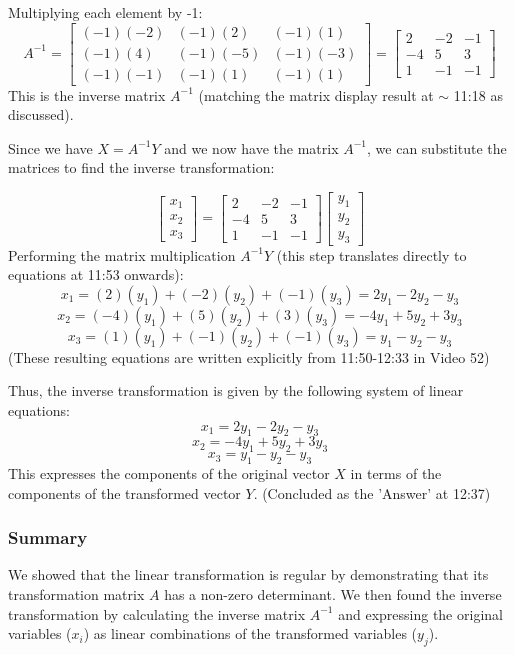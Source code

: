 \documentclass{article}
\begin{document}
    Multiplying each element by -1:
    \[ A^{-1} = \begin{bmatrix} (-1)(-2) & (-1)(2) & (-1)(1) \\ (-1)(4) & (-1)(-5) & (-1)(-3) \\ (-1)(-1) & (-1)(1) & (-1)(1) \end{bmatrix} = \begin{bmatrix} 2 & -2 & -1 \\ -4 & 5 & 3 \\ 1 & -1 & -1 \end{bmatrix} \]
    This is the inverse matrix $A^{-1}$ (matching the matrix display result at $\sim$ 11:18 as discussed).

Since we have $X = A^{-1} Y$ and we now have the matrix $A^{-1}$, we can substitute the matrices to find the inverse transformation:

\[ \begin{bmatrix} x_1 \\ x_2 \\ x_3 \end{bmatrix} = \begin{bmatrix} 2 & -2 & -1 \\ -4 & 5 & 3 \\ 1 & -1 & -1 \end{bmatrix} \begin{bmatrix} y_1 \\ y_2 \\ y_3 \end{bmatrix} \]
Performing the matrix multiplication $A^{-1}Y$ (this step translates directly to equations at 11:53 onwards):
\[ x_1 = (2)(y_1) + (-2)(y_2) + (-1)(y_3) = 2y_1 - 2y_2 - y_3 \]
\[ x_2 = (-4)(y_1) + (5)(y_2) + (3)(y_3) = -4y_1 + 5y_2 + 3y_3 \]
\[ x_3 = (1)(y_1) + (-1)(y_2) + (-1)(y_3) = y_1 - y_2 - y_3 \]
(These resulting equations are written explicitly from 11:50-12:33 in Video 52)

Thus, the inverse transformation is given by the following system of linear equations:
\[ x_1 = 2y_1 - 2y_2 - y_3 \]
\[ x_2 = -4y_1 + 5y_2 + 3y_3 \]
\[ x_3 = y_1 - y_2 - y_3 \]
This expresses the components of the original vector $X$ in terms of the components of the transformed vector $Y$. (Concluded as the 'Answer' at 12:37)

\subsubsection*{Summary}

We showed that the linear transformation is regular by demonstrating that its transformation matrix $A$ has a non-zero determinant. We then found the inverse transformation by calculating the inverse matrix $A^{-1}$ and expressing the original variables ($x_i$) as linear combinations of the transformed variables ($y_j$).
\end{document}
